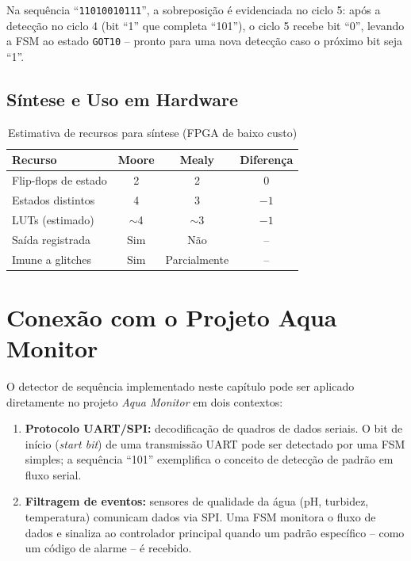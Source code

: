 \documentclass[12pt,a4paper]{article}
\begin{document}
Na sequência ``\texttt{11010010111}'', a sobreposição é evidenciada no ciclo 5:
após a detecção no ciclo 4 (bit ``1'' que completa ``101''), o ciclo 5 recebe
bit ``0'', levando a FSM ao estado \texttt{GOT10} -- pronto para uma nova
detecção caso o próximo bit seja ``1''.

\subsection{Síntese e Uso em Hardware}

\begin{table}[H]
  \centering
  \caption{Estimativa de recursos para síntese (FPGA de baixo custo)}
  \label{tab:sintese}
  \begin{tabular}{lccc}
    \toprule
    \textbf{Recurso} & \textbf{Moore} & \textbf{Mealy} & \textbf{Diferença} \\
    \midrule
    Flip-flops de estado & 2 & 2 & 0 \\
    Estados distintos    & 4 & 3 & $-1$ \\
    LUTs (estimado)      & $\sim$4 & $\sim$3 & $-1$ \\
    Saída registrada     & Sim & Não & -- \\
    Imune a glitches     & Sim & Parcialmente & -- \\
    \bottomrule
  \end{tabular}
\end{table}

\section{Conexão com o Projeto Aqua Monitor}

O detector de sequência implementado neste capítulo pode ser aplicado diretamente
no projeto \textit{Aqua Monitor} em dois contextos:

\begin{enumerate}[leftmargin=1.5cm]
  \item \textbf{Protocolo UART/SPI:} decodificação de quadros de dados seriais.
        O bit de início (\textit{start bit}) de uma transmissão UART pode ser
        detectado por uma FSM simples; a sequência ``101'' exemplifica o conceito
        de detecção de padrão em fluxo serial.
  \item \textbf{Filtragem de eventos:} sensores de qualidade da água (pH, turbidez,
        temperatura) comunicam dados via SPI. Uma FSM monitora o fluxo de dados e
        sinaliza ao controlador principal quando um padrão específico -- como um
        código de alarme -- é recebido.
\end{enumerate}
\end{document}
